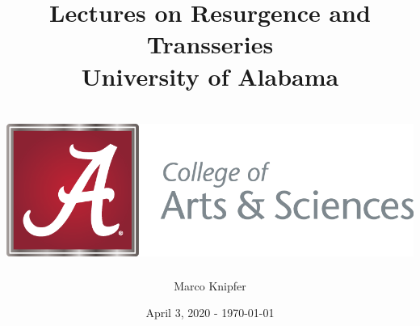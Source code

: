 \documentclass[12pt]{report}
\title{%
{Lectures on Resurgence and Transseries}\\
{\large University of Alabama}\\~\\
{\includegraphics{figures/UA-ArtsSciences.png}}
}
\author{Marco Knipfer}
\date{April 3, 2020 - \today}
\begin{document}
\begin{titlepage}
    \maketitle
\end{titlepage}


\tableofcontents




 
\end{document}
